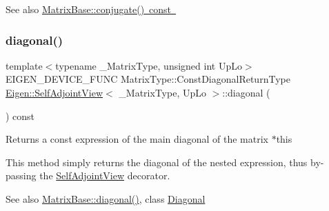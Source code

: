 \begin{DoxySeeAlso}{See also}
\mbox{\hyperlink{class_eigen_1_1_matrix_base_a28ca7fb2f2140c1429492788a65ad741}{Matrix\+Base\+::conjugate() const }} 
\end{DoxySeeAlso}
\mbox{\label{class_eigen_1_1_self_adjoint_view_abe2f0e6cbade78463ff973178947db98}} 
\subsubsection{\texorpdfstring{diagonal()}{diagonal()}}
{\footnotesize\ttfamily template$<$typename \+\_\+\+Matrix\+Type, unsigned int Up\+Lo$>$ \\
E\+I\+G\+E\+N\+\_\+\+D\+E\+V\+I\+C\+E\+\_\+\+F\+U\+NC Matrix\+Type\+::\+Const\+Diagonal\+Return\+Type \mbox{\hyperlink{class_eigen_1_1_self_adjoint_view}{Eigen\+::\+Self\+Adjoint\+View}}$<$ \+\_\+\+Matrix\+Type, Up\+Lo $>$\+::diagonal (\begin{DoxyParamCaption}{ }\end{DoxyParamCaption}) const\hspace{0.3cm}{\ttfamily [inline]}}

\begin{DoxyReturn}{Returns}
a const expression of the main diagonal of the matrix {\ttfamily $\ast$this} 
\end{DoxyReturn}
This method simply returns the diagonal of the nested expression, thus by-\/passing the \mbox{\hyperlink{class_eigen_1_1_self_adjoint_view}{Self\+Adjoint\+View}} decorator.

\begin{DoxySeeAlso}{See also}
\mbox{\hyperlink{class_eigen_1_1_matrix_base_ab5768147536273eb2dbdfa389cfd26a3}{Matrix\+Base\+::diagonal()}}, class \mbox{\hyperlink{class_eigen_1_1_diagonal}{Diagonal}} 
\end{DoxySeeAlso}
\mbox{\label{class_eigen_1_1_self_adjoint_view_ad4f34424b4ea12de9bbc5623cb938b4f}} 

